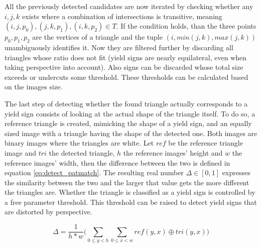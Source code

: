 \documentclass{report}
\begin{document}
All the previously detected candidates are now iterated by checking
whether any \( i, j, k \) exists where a combination of intersections
is transitive, meaning \( (i, j, p_0), (j, k, p_1), (i, k, p_2) \in T
\). If the condition holds, than the three points \( p_0, p_1, p_2 \)
are the vertices of a triangle and the tuple \( (i, min(j,k),
max(j,k)) \) unambiguously identifies it. Now they are filtered
further by discarding all triangles whose ratio does not fit (yield
signs are nearly equilateral, even when taking perspective into
account). Also signs can be discarded whose total size exceeds or
undercuts some threshold. These thresholds can be calculated based on
the images size.

The last step of detecting whether the found triangle actually
corresponds to a yield sign consists of looking at the actual shape of
the triangle itself. To do so, a reference triangle is created,
mimicking the shape of a yield sign, and an equally sized image with a
triangle having the shape of the detected one. Both images are binary
images where the triangles are white. Let \( ref \) be the reference
triangle image and \( tri \) the detected triangle, \( h \) the
reference images' height and \( w \) the reference images' width, then
the difference between the two is defined in equation
\ref{eq:detect_patmatch}. The resulting real number \( \Delta \in [0,
  1] \) expresses the similarity between the two and the larger that
value gets the more different the triangles are. Whether the triangle
is classified as a yield sign is controlled by a free parameter
threshold. This threshold can be raised to detect yield signs that are
distorted by perspective.

\begin{equation}\label{eq:detect_patmatch}
  \Delta = \frac{1}{h * w} \Bigg( \sum_{0 \leq y < h}\sum_{0 \leq x <w} ref(y, x) \oplus tri(y, x) \Bigg)
\end{equation}
\end{document}
